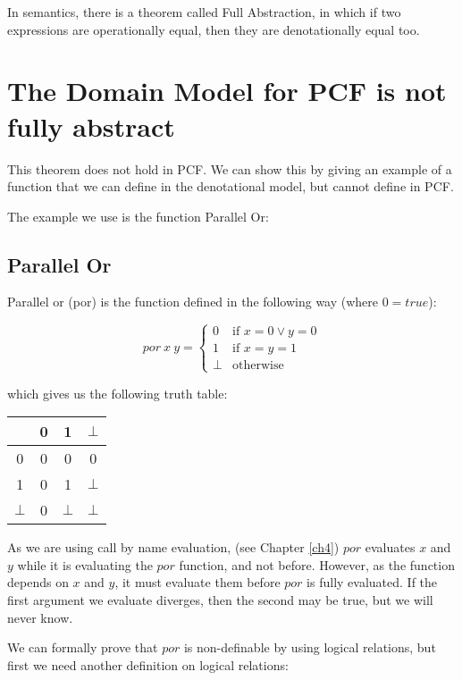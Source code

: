 In semantics, there is a theorem called Full Abstraction, in which if two expressions are operationally equal, then they are denotationally equal too.

\section{The Domain Model for PCF is not fully abstract}
This theorem does not hold in PCF. We can show this by giving an example of a function that we can define in the denotational model, but cannot define in PCF.

The example we use is the function  Parallel Or:

\subsection{Parallel Or}

Parallel or (por) is the function defined in the following way (where $0 = true$):

\[ por \ x \ y =
\left\{
	\begin{array}{ll}
		0  & \mbox{if } x = 0  \vee y = 0 \\
		1 & \mbox{if } x = y = 1 \\
		\bot & \mbox{otherwise}
	\end{array}
\right.\]

which gives us the following truth table:
\begin{center}
\begin{tabular}{ c | c | c | c}
    & 0 & 1 & $\bot$ \\
    \hline
   0 & 0 & 0 & 0 \\
   1 & 0 & 1 & $\bot$ \\
   $\bot$ & 0 & $\bot$ & $\bot$\\   
\end{tabular}
\end{center}

\vspace{0.5cm}

As we are using call by name evaluation, (see Chapter \ref{ch4}) $por$ evaluates $x$ and $y$ while it is evaluating the $por$  function, and not before. However, as the function depends on $x$ and $y$, it must evaluate them before $por$ is fully evaluated. If the first argument we evaluate diverges, then the second may be true, but we will never know.

We can formally prove that $por$ is non-definable by using logical relations, but first we need another definition on logical relations:

